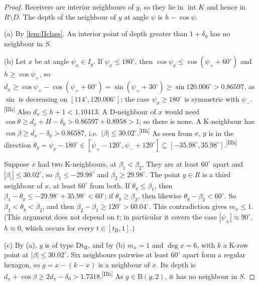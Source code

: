 \documentclass[11pt]{amsart}
\theoremstyle{definition}
\theoremstyle{remark}
\newcommand{\Dd}{\mathrm{B}}      %
\newcommand{\chk}[1]{\textsuperscript{[#1]}}
\begin{document}
\begin{proof}
Receivers are interior neighbours of $y$, so they lie in $\operatorname{int}K$ and hence in $R\setminus D$. The depth of the neighbour of $y$ at angle $\psi$ is $h-\cos\psi$.

(a) By \cref{lem:IIclass}. An interior point of depth greater than $1+\delta_0$ has no neighbour in $S$.

(b) Let $x$ be at angle $\psi_x\in I_y$. If $\psi_x\le180^\circ$, then $\cos\psi_x\le\cos(\psi_++60^\circ)$ and $h\ge\cos\psi_+$, so $d_x\ge\cos\psi_+-\cos(\psi_++60^\circ)=\sin(\psi_++30^\circ)\ge\sin120.006^\circ>0.86597$, as $\sin$ is decreasing on $[114^\circ,120.006^\circ]$; the case $\psi_x\ge180^\circ$ is symmetric with $\psi_-$.\chk{IIh} Also $d_x\le h+1<1.10413$. A D-neighbour of $x$ would need $\cos\theta\ge d_x+H-\delta_0>0.86597+0.8958>1$; so there is none. A K-neighbour has $\cos\beta\ge d_x-\delta_0>0.86587$, i.e.\ $|\beta|\le30.02^\circ$.\chk{IIh} As seen from $x$, $y$ is in the direction $\theta_y=\psi_x-180^\circ\in[\psi_+-120^\circ,\psi_-+120^\circ]\subseteq[-35.98^\circ,35.98^\circ]$.\chk{IIh}

Suppose $x$ had two K-neighbours, at $\beta_1<\beta_2$. They are at least $60^\circ$ apart and $|\beta_i|\le30.02^\circ$, so $\beta_1\le-29.98^\circ$ and $\beta_2\ge29.98^\circ$. The point $y\in R$ is a third neighbour of $x$, at least $60^\circ$ from both. If $\theta_y\le\beta_1$, then $\beta_1-\theta_y\le-29.98^\circ+35.98^\circ<60^\circ$; if $\theta_y\ge\beta_2$, then likewise $\theta_y-\beta_2<60^\circ$. So $\beta_1<\theta_y<\beta_2$, and then $\beta_2-\beta_1\ge120^\circ>60.04^\circ$. This contradiction gives $m_x\le1$. (This argument does not depend on $t$; in particular it covers the case $|\psi_\pm|\approx90^\circ$, $h\approx0$, which occurs for every $t\in[t_{\mathrm{II}},1]$.)

(c) By (a), $y$ is of type Dt$_{\mathrm{II}}$, and by (b) $m_x=1$ and $\deg x=6$, with $k$ a K-row point at $|\beta|\le30.02^\circ$. Six neighbours pairwise at least $60^\circ$ apart form a regular hexagon, so $g=x-(k-x)$ is a neighbour of $x$. Its depth is $d_x+\cos\beta\ge2d_x-\delta_0>1.7318$.\chk{IIh} As $g\in\Dd(y,2)$, it has no neighbour in $S$.
\end{proof}
\end{document}

